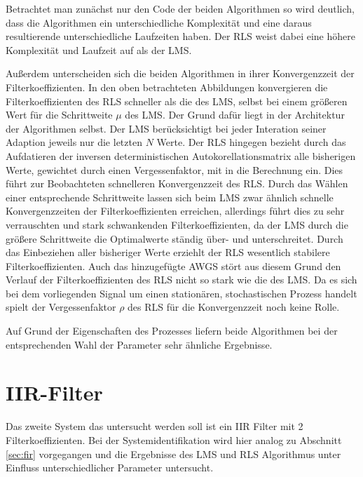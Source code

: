 Betrachtet man zunächst nur den Code der beiden Algorithmen so wird deutlich, dass die Algorithmen ein unterschiedliche Komplexität und eine daraus resultierende unterschiedliche Laufzeiten haben.
Der RLS weist dabei eine höhere Komplexität und Laufzeit auf als der LMS.

Außerdem unterscheiden sich die beiden Algorithmen in ihrer Konvergenzzeit der Filterkoeffizienten.
In den oben betrachteten Abbildungen konvergieren die Filterkoeffizienten des RLS schneller als die des LMS, selbst bei einem größeren Wert für die Schrittweite $\mu$ des LMS.
Der Grund dafür liegt in der Architektur der Algorithmen selbst.
Der LMS berücksichtigt bei jeder Interation seiner Adaption jeweils nur die letzten $N$ Werte.
Der RLS hingegen bezieht durch das Aufdatieren der inversen deterministischen Autokorellationsmatrix alle bisherigen Werte, gewichtet durch einen Vergessenfaktor, mit in die Berechnung ein.
Dies führt zur Beobachteten schnelleren Konvergenzzeit des RLS.
Durch das Wählen einer entsprechende Schrittweite lassen sich beim LMS zwar ähnlich schnelle Konvergenzzeiten der Filterkoeffizienten erreichen, allerdings führt dies zu sehr verrauschten und stark schwankenden Filterkoeffizienten, da der LMS durch die größere Schrittweite die Optimalwerte ständig über- und unterschreitet.
Durch das Einbeziehen aller bisheriger Werte erziehlt der RLS wesentlich stabilere Filterkoeffizienten.
Auch das hinzugefügte AWGS stört aus diesem Grund den Verlauf der Filterkoeffizienten des RLS nicht so stark wie die des LMS.
Da es sich bei dem vorliegenden Signal um einen stationären, stochastischen Prozess handelt spielt der Vergessenfaktor $\rho$ des RLS für die Konvergenzzeit noch keine Rolle.

Auf Grund der Eigenschaften des Prozesses liefern beide Algorithmen bei der entsprechenden Wahl der Parameter sehr ähnliche Ergebnisse.







\section{IIR-Filter}
\label{sec:iir}

Das zweite System das untersucht werden soll ist ein IIR Filter mit 2 Filterkoeffizienten.
Bei der Systemidentifikation wird hier analog zu Abschnitt \ref{sec:fir} vorgegangen und die Ergebnisse des LMS und RLS Algorithmus unter Einfluss unterschiedlicher Parameter untersucht.

